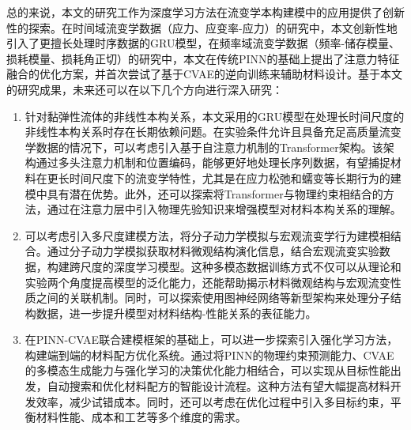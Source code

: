总的来说，本文的研究工作为深度学习方法在流变学本构建模中的应用提供了创新性的探索。在时间域流变学数据（应力、应变率-应力）的研究中，本文创新性地引入了更擅长处理时序数据的GRU模型，在频率域流变学数据（频率-储存模量、损耗模量、损耗角正切）的研究中，本文在传统PINN的基础上提出了注意力特征融合的优化方案，并首次尝试了基于CVAE的逆向训练来辅助材料设计。基于本文的研究成果，未来还可以在以下几个方向进行深入研究：

\begin{enumerate}[topsep = 0 pt, itemsep= 0 pt, parsep=0pt, partopsep=0pt, leftmargin=44pt, itemindent=0pt, labelsep=6pt, label=(\arabic*)]
  \item 针对黏弹性流体的非线性本构关系，本文采用的GRU模型在处理长时间尺度的非线性本构关系时存在长期依赖问题。在实验条件允许且具备充足高质量流变学数据的情况下，可以考虑引入基于自注意力机制的Transformer架构。该架构通过多头注意力机制和位置编码，能够更好地处理长序列数据，有望捕捉材料在更长时间尺度下的流变学特性，尤其是在应力松弛和蠕变等长期行为的建模中具有潜在优势。此外，还可以探索将Transformer与物理约束相结合的方法，通过在注意力层中引入物理先验知识来增强模型对材料本构关系的理解。

  \item 可以考虑引入多尺度建模方法，将分子动力学模拟与宏观流变学行为建模相结合。通过分子动力学模拟获取材料微观结构演化信息，结合宏观流变实验数据，构建跨尺度的深度学习模型。这种多模态数据训练方式不仅可以从理论和实验两个角度提高模型的泛化能力，还能帮助揭示材料微观结构与宏观流变性质之间的关联机制。同时，可以探索使用图神经网络等新型架构来处理分子结构数据，进一步提升模型对材料结构-性能关系的表征能力。

  \item 在PINN-CVAE联合建模框架的基础上，可以进一步探索引入强化学习方法，构建端到端的材料配方优化系统。通过将PINN的物理约束预测能力、CVAE的多模态生成能力与强化学习的决策优化能力相结合，可以实现从目标性能出发，自动搜索和优化材料配方的智能设计流程。这种方法有望大幅提高材料开发效率，减少试错成本。同时，还可以考虑在优化过程中引入多目标约束，平衡材料性能、成本和工艺等多个维度的需求。
\end{enumerate}

